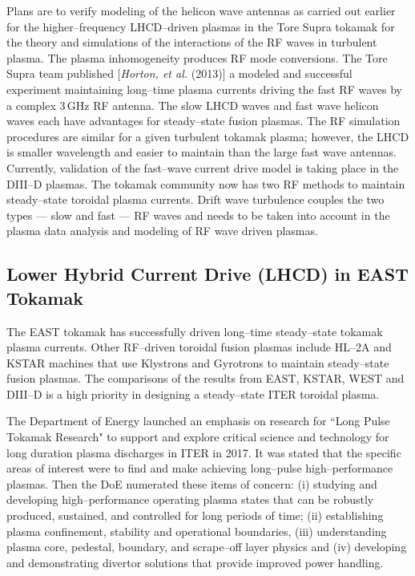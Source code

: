 \documentclass[a4paper,openany,12pt]{book}
\begin{document}
Plans are to verify modeling of the helicon wave antennas as carried out earlier for the higher--frequency LHCD--driven plasmas in the Tore Supra tokamak for the theory and simulations of the interactions of the RF waves in turbulent plasma. The plasma inhomogeneity produces RF mode conversions. The Tore Supra team published [\emph{Horton, et al.} (2013)] a modeled and successful experiment maintaining long--time plasma currents driving the fast RF waves by a complex $3\,$GHz RF antenna. The slow LHCD waves and fast wave helicon waves each have advantages for steady--state fusion plasmas. The RF simulation procedures are similar for a given turbulent tokamak plasma; however, the LHCD is smaller wavelength and easier to maintain than the large fast wave antennas. Currently, validation of the fast--wave current drive model is taking place in the DIII--D plasmas. The tokamak community now has two RF methods to maintain steady--state toroidal plasma currents. Drift wave turbulence couples the two types --- slow and fast --- RF waves and needs to be taken into account in the plasma data analysis and modeling of RF wave driven plasmas.

\subsection*{Lower Hybrid Current Drive (LHCD) in EAST Tokamak}

The EAST tokamak has successfully driven long--time steady--state tokamak plasma currents. Other RF--driven toroidal fusion plasmas include HL--2A and KSTAR machines that use Klystrons and Gyrotrons to maintain steady--state fusion plasmas. The comparisons of the results from EAST, KSTAR, WEST and DIII--D is a high priority in designing a steady--state ITER toroidal plasma. 

The Department of Energy launched an emphasis on research for ``Long Pulse Tokamak Research" to support and explore critical science and technology for long duration plasma discharges in ITER in 2017. It was stated that the specific areas of interest were to find and make achieving long--pulse high--performance plasmas. Then the DoE numerated these items of concern: (i) studying and developing high--performance operating plasma states that can be robustly produced, sustained, and controlled for long periods of time; (ii) establishing plasma confinement, stability and operational boundaries, (iii) understanding plasma core, pedestal, boundary, and scrape--off layer physics and (iv) developing and demonstrating divertor solutions that provide improved power handling.
\end{document}
